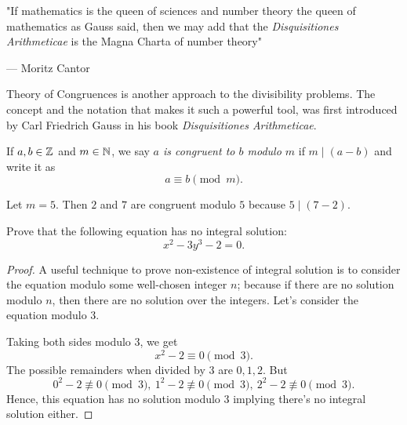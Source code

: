 \epigraph{"If mathematics is the queen of sciences and number theory the queen of mathematics as Gauss said, then we may add that the \textit{Disquisitiones Arithmeticae} is the Magna Charta of number theory"}{--- \textup{Moritz Cantor}}
Theory of Congruences is another approach to the divisibility problems. The concept and the notation that makes it such a powerful tool, was first introduced by Carl Friedrich Gauss in his book \textit{Disquisitiones Arithmeticae}.
\begin{definition}
    If $a, b \in \mathbb{Z}$ and $m \in \mathbb{N}$, we say \textit{$a$ is congruent to $b$ modulo $m$} if $m \mid (a-b)$ and write it as \[a \equiv b \pmod{m}.\]
\end{definition}
\begin{eg}
    Let $m=5$. Then $2$ and $7$ are congruent modulo $5$ because $5 \mid (7-2)$.
\end{eg}
\begin{eg}
    Prove that the following equation has no integral solution:
\[
    x^2 - 3y^3 - 2 = 0.
\]
\end{eg}
\begin{proof}
    A useful technique to prove non-existence of integral solution is to consider the equation modulo some well-chosen integer $n$; because if there are no solution modulo $n$, then there are no solution over the integers. Let's consider the equation modulo $3$.

    Taking both sides modulo $3$, we get
    \[
    x^2 - 2 \equiv 0 \pmod{3}.
    \]
    The possible remainders when divided by $3$ are $0, 1, 2$. But
    \[0^2 - 2 \not\equiv 0 \pmod{3}, \ 1^2 - 2 \not\equiv 0 \pmod{3}, \ 2^2 - 2 \not\equiv 0 \pmod{3}.\]
    Hence, this equation has no solution modulo $3$ implying there's no integral solution either.
\end{proof}
\newpage
